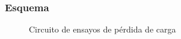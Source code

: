 \documentclass{article}
\begin{document}
\subsubsection*{Esquema}
\begin{figure}[H]
\begin{center}
\end{center}
\caption{Circuito de ensayos de pérdida de carga}
\end{figure}
\end{document}
